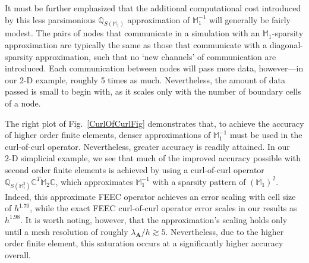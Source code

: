 \documentclass[final,twocolumn]{elsarticle}
\newcommand{\w}[1]{\ensuremath{\mathbf{#1}}} %
\newcommand{\norm}[1]{\left\lVert#1\right\rVert}
\newcommand*\mC{\mathbb{C}}
\newcommand*\mI{\mathcal{I}}
\newcommand*\mM{\mathbb{M}}
\newcommand*\mQ{\mathbb{Q}}
\DeclareMathOperator*{\argmin}{arg\,min}
\newcommand{\cmmnt}[1]{\ignorespaces} %
\begin{document}
It must be further emphasized that the additional computational cost introduced by this less parsimonious $\mQ_{S(\mM_1)}$ approximation of $\mM_1^{-1}$ will generally be fairly modest. The pairs of nodes that communicate in a simulation with an $\mM_1$-sparsity approximation are typically the same as those that communicate with a diagonal-sparsity approximation, such that no `new channels' of communication are introduced. Each communication between nodes will pass more data, however---in our ${\text{2-D}}$ example, roughly 5 times as much. Nevertheless, the amount of data passed is small to begin with, as it scales only with the number of boundary cells of a node.

The right plot of Fig.~\ref{CurlOfCurlFig} demonstrates that, to achieve the accuracy of higher order finite elements, denser approximations of $\mM_1^{-1}$ must be used in the curl-of-curl operator. Nevertheless, greater accuracy is readily attained. In our ${\text{2-D}}$ simplicial example, we see that much of the improved accuracy possible with second order finite elements is achieved by using a curl-of-curl operator ${\mQ_{S(\mM_1^2)}\mC^T\mM_2\mC}$, which approximates $\mM_1^{-1}$ with a sparsity pattern of ${(\mM_1)^2}$. Indeed, this approximate FEEC operator achieves an error scaling with cell size of $h^{1.70}$, while the exact FEEC curl-of-curl operator error scales in our results as $h^{1.98}$. It is worth noting, however, that the approximation's scaling holds only until a mesh resolution of roughly ${\lambda_\w{A}/h\gtrsim5}$. Nevertheless, due to the higher order finite element, this saturation occurs at a significantly higher accuracy overall.

\cmmnt{
By numerical experimentation, we will in fact find that it is advantageous to solve a slightly modified least squares problem:
\begin{eqn}
\argmin\limits_{\w{q}_\ell(\mI_\ell)}\sum\limits_{i,j\in\mI_\ell}\Big(\mM_{ij}(\w{q}_\ell)_j-\delta_{i\ell}\Big)^2,
\label{ModHuckleMethod}
\end{eqn}
in which only a square submatrix ${\mM_1(\mI_\ell,\mI_\ell)}$ of $\mM_1$ is used to compute each column $\w{q}_\ell$, rather than the complete columns ${\mM(:,\mI_\ell)}$ considered in Eq.~(\ref{HuckleMethod}). This modification is somewhat simpler to implement in a massively parallel setting, and, despite its reduction of input information, generally produces more accurate estimates of $\mM_1^{-1}$ (as measured by $\norm{\cdot}_F$) in numerical experimentations, as described below.

\begin{figure*}[h!]
\texttt{[image: Discrete\_Curl\_of\_Curl\_Accuracy\_vs\_M1inv\_Method.png]}
\caption{}
\label{CurlOfCurlFig}
\end{figure*}
}
\end{document}
